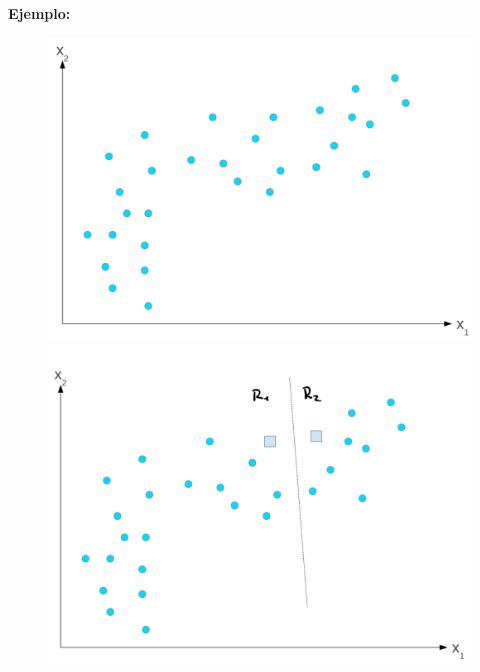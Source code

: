 \documentclass[12pt, twoside, openright]{report} %
\begin{document}
\textbf{Ejemplo:}

\begin{figure}[H]
	{\includegraphics[scale=.2]{2021-03-26 09_37_22-Aprendizaje basado en instancias y no supervisados.pdf - Foxit Reader.png}
		\includegraphics[scale=.2]{2021-03-26 09_38_09-Aprendizaje basado en instancias y no supervisados.pdf - Foxit Reader.png}}
\end{figure}
\end{document}
